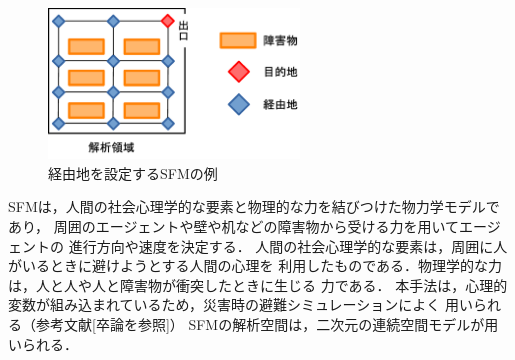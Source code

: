 \begin{figure}[hbtp]
 \begin{center}
  \includegraphics[height=4cm,clip]{figure/keiyuti_ex2.eps}
  \caption{経由地を設定するSFMの例}
  \label{fig:jitumondai_ex}
 \end{center}
\end{figure}



SFMは，人間の社会心理学的な要素と物理的な力を結びつけた物力学モデルであり，
周囲のエージェントや壁や机などの障害物から受ける力を用いてエージェントの
進行方向や速度を決定する．
人間の社会心理学的な要素は，周囲に人がいるときに避けようとする人間の心理を
利用したものである．物理学的な力は，人と人や人と障害物が衝突したときに生じる
力である．
本手法は，心理的変数が組み込まれているため，災害時の避難シミュレーションによく
用いられる（参考文献[卒論を参照]）
SFMの解析空間は，二次元の連続空間モデルが用いられる．



